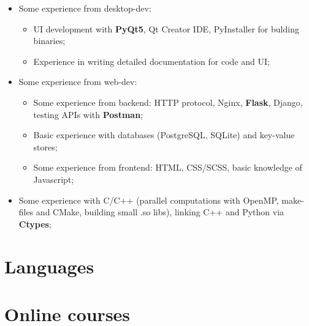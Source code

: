 \documentclass[12pt,a4paper]{moderncv}
\begin{document}
{\begin{itemize}
\begin{itemize}
        gradient boosting with \textbf{CatBoost}; experience with Torch; \newline
        \item Advanced work with \textbf{LaTeX} for scientific texts and presentations; \newline
    \end{itemize} 
 \item Some experience from desktop-dev:\newline
    \begin{itemize}
        \item UI development with \textbf{PyQt5}, Qt Creator IDE, PyInstaller for bulding binaries; \newline
        \item Experience in writing detailed documentation for code and UI; \newline
    \end{itemize}
 \item Some experience from web-dev: \newline
    \begin{itemize}
        \item Some experience from backend: 
          HTTP protocol, Nginx, \textbf{Flask}, Django, testing APIs with \textbf{Postman};\newline
        \item Basic experience with databases (PostgreSQL, SQLite) and key-value stores;\newline
        \item Some experience from frontend: HTML, CSS/SCSS, basic knowledge of Javascript; \newline
    \end{itemize}
 \item Some experience with C/C++ (parallel computations with OpenMP, make-files and CMake, building small .so libs), linking C++ and Python via \textbf{Ctypes}; \newline \newline
\end{itemize}
}{}{}{}{}
\section{Languages}
\section{Online courses}
\newline\newline
{} 
\end{document}
